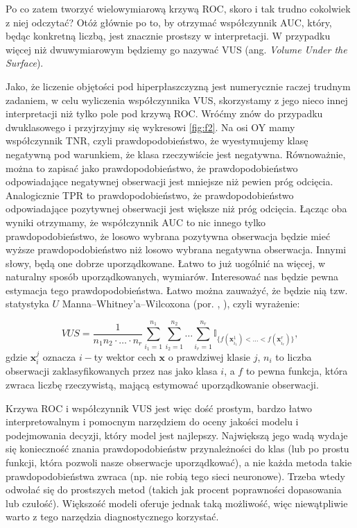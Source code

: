 \documentclass{mini}
\begin{document}
Po co zatem tworzyć wielowymiarową krzywą ROC, skoro i tak trudno cokolwiek z niej odczytać? Otóż głównie po to, by otrzymać współczynnik AUC, który, będąc konkretną liczbą, jest znacznie prostszy w interpretacji. W przypadku więcej niż dwuwymiarowym będziemy go nazywać VUS (ang. \textit{Volume Under the Surface}). 

Jako, że liczenie objętości pod hiperpłaszczyzną jest numerycznie raczej trudnym zadaniem, w celu wyliczenia współczynnika VUS, skorzystamy z jego nieco innej interpretacji niż tylko pole pod krzywą ROC. Wróćmy znów do przypadku dwuklasowego i przyjrzyjmy się wykresowi \ref{fig:f2}. Na osi OY mamy współczynnik TNR, czyli prawdopodobieństwo, że wyestymujemy klasę negatywną pod warunkiem, że klasa rzeczywiście jest negatywna. Równoważnie, można to zapisać jako prawdopodobieństwo, że prawdopodobieństwo odpowiadające negatywnej obserwacji jest mniejsze niż pewien próg odcięcia. Analogicznie TPR to prawdopodobieństwo, że prawdopodobieństwo odpowiadające pozytywnej obserwacji jest większe niż próg odcięcia. Łącząc oba wyniki otrzymamy, że współczynnik AUC to nic innego tylko prawdopodobieństwo, że losowo wybrana pozytywna obserwacja będzie mieć wyższe prawdopodobieństwo niż losowo wybrana negatywna obserwacja. Innymi słowy, będą one dobrze uporządkowane. Łatwo to już uogólnić na więcej, w naturalny sposób uporządkowanych, wymiarów. Interesować nas będzie pewna estymacja tego prawdopodobieństwa. Łatwo można zauważyć, że będzie nią tzw. statystyka $U$  Manna–Whitney'a–Wilcoxona (por. \cite{roc1}, \cite{roc2}), czyli wyrażenie:

$$
VUS = \dfrac{1}{n_1n_2\cdot\ldots\cdot n_r}\sum_{i_1=1}^{n_1}\sum_{i_2=1}^{n_2}\ldots\sum_{i_r=1}^{n_r}\mathbb{I}_{\lbrace f(\mathbf{x}_{i_1}^1)<\ldots<f(\mathbf{x}_{i_r}^r)\rbrace},
$$
gdzie $\textbf{x}_i^j$ oznacza $i-$ty wektor cech $\mathbf{x}$ o prawdziwej klasie $j$, $n_i$ to liczba obserwacji zaklasyfikowanych przez nas jako klasa $i$, a $f$ to pewna funkcja, która zwraca liczbę rzeczywistą, mającą estymować uporządkowanie obserwacji. 

Krzywa ROC i współczynnik VUS jest więc dość prostym, bardzo łatwo interpretowalnym i pomocnym narzędziem do oceny jakości modelu i podejmowania decyzji, który model jest najlepszy. Największą jego wadą wydaje się konieczność znania prawdopodobieństw przynależności do klas (lub po prostu funkcji, która pozwoli nasze obserwacje uporządkować), a nie każda metoda takie prawdopodobieństwa zwraca (np. nie robią tego sieci neuronowe). Trzeba wtedy odwołać się do prostszych metod (takich jak procent poprawności dopasowania lub czułość). Większość modeli oferuje jednak taką możliwość, więc niewątpliwie warto z tego narzędzia diagnostycznego korzystać.
\end{document}
